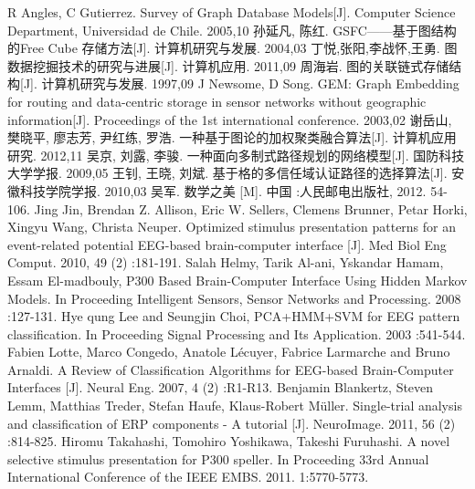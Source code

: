 \documentclass[a4paper]{ecust_thesis_openning}
\newcommand\journal[1]{#1}
\begin{document}
\begin{thebibliography}{99}
\setlength{\itemsep}{-0.4ex}
	 R Angles, C Gutierrez.  Survey of Graph Database Models[J]. \journal{Computer Science Department, Universidad de Chile}. 2005,10
	 孙延凡, 陈红.  GSFC——基于图结构的Free Cube 存储方法[J]. \journal{计算机研究与发展}. 2004,03
	 丁悦,张阳,李战怀,王勇.  图数据挖掘技术的研究与进展[J]. \journal{计算机应用}. 2011,09
	 周海岩.  图的关联链式存储结构[J]. \journal{计算机研究与发展}. 1997,09
	 J Newsome, D Song.  GEM: Graph Embedding for routing and data-centric storage in sensor networks without geographic information[J]. \journal{Proceedings of the 1st international conference}. 2003,02
	谢岳山, 樊晓平, 廖志芳, 尹红练, 罗浩.  一种基于图论的加权聚类融合算法[J]. \journal{计算机应用研究}. 2012,11
	吴京, 刘露, 李骏.  一种面向多制式路径规划的网络模型[J]. \journal{国防科技大学学报}. 2009,05
	王钊, 王晓, 刘斌.  基于格的多信任域认证路径的选择算法[J]. \journal{安徽科技学院学报}. 2010,03
	吴军. 数学之美 [M]. 中国 :人民邮电出版社, 2012. 54-106.
	 Jing Jin, Brendan Z. Allison, Eric W. Sellers, Clemens Brunner, Petar Horki, Xingyu Wang, Christa Neuper. Optimized stimulus presentation patterns for an event-related potential EEG-based brain-computer interface [J].  \journal{Med Biol Eng Comput}. 2010, 49 (2) :181-191.
	 Salah Helmy, Tarik Al-ani, Yskandar Hamam, Essam El-madbouly, P300 Based Brain-Computer Interface Using Hidden Markov Models. In Proceeding \journal{Intelligent Sensors, Sensor Networks and Processing}.  2008 :127-131.
	 Hye qung Lee and Seungjin Choi, PCA+HMM+SVM for EEG pattern classification.  In Proceeding \journal{Signal Processing and Its Application}. 2003 :541-544.
	 Fabien Lotte, Marco Congedo, Anatole L\'ecuyer, Fabrice Larmarche and Bruno Arnaldi. A Review of Classification Algorithms for EEG-based Brain-Computer Interfaces [J].  \journal{Neural Eng}. 2007, 4 (2) :R1-R13.
	 Benjamin Blankertz, Steven Lemm, Matthias Treder, Stefan Haufe, Klaus-Robert M\"uller.  Single-trial analysis and classification of ERP components - A tutorial [J].  \journal{NeuroImage}.  2011, 56 (2) :814-825.
	 Hiromu Takahashi, Tomohiro Yoshikawa, Takeshi Furuhashi.  A novel selective stimulus presentation for P300 speller. In Proceeding \journal{33rd Annual International Conference of the IEEE EMBS}. 2011. 1:5770-5773.

\end{thebibliography}
\end{document}
